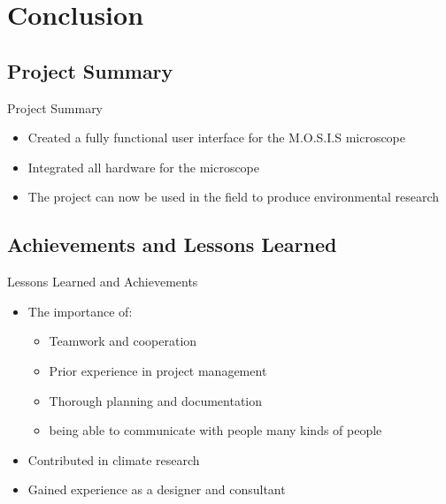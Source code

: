 \documentclass[17pt, aspectratio=169]{beamer}
\begin{document}
\section{Conclusion}
\subsection{Project Summary}
\begin{frame}{Project Summary}
	\begin{itemize}
		\item Created a fully functional user interface for the M.O.S.I.S microscope
		\item Integrated all hardware for the microscope
		\item The project can now be used in the field to produce environmental research
	\end{itemize}
\end{frame}
\subsection{Achievements and Lessons Learned}
\begin{frame}{Lessons Learned and Achievements}
	\begin{itemize}
		\item The importance of:
		      \begin{itemize}
			      \item Teamwork and cooperation
			      \item Prior experience in project management
			      \item Thorough planning and documentation
			      \item being able to communicate with people many kinds of people
		      \end{itemize}
		\item Contributed in climate research
		\item Gained experience as a designer and consultant
	\end{itemize}
\end{frame}
\end{document}
